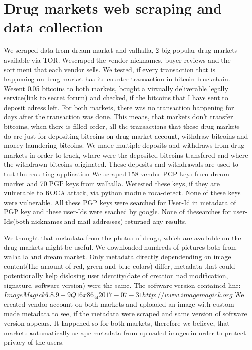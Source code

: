 \documentclass[
  digital, %
  table,   %
  lof,     %
  lot,     %
  oneside
]{fithesis3}
\begin{document}
\section{Drug markets web scraping and data collection}
We scraped data from dream market and valhalla, 2 big popular drug markets available via TOR. Wescraped the vendor nicknames, buyer reviews and the sortiment that each vendor sells.
We tested, if every transaction that is happening on drug market has its counter transaction in bitcoin blockchain. Wesent 0.05 bitcoins to both markets,
bought a virtually deliverable legally service(link to secret forum) and checked, if the bitcoins that I have sent to deposit adress left.
For both markets, there was no transaction happening for days after the transaction was done. This means, that markets don't transfer bitcoins,
when there is filled order, all the transactions that these drug markets do are just for depositing bitcoins on drug market account,
withdraw bitcoins and money laundering bitcoins.
We made multiple deposits and withdraws from drug markets in order to track, where were the deposited bitcoins transfered and where the withdrawn bitcoins originated.
These deposits and withdrawals are used to test the resulting application
We scraped 158 vendor PGP keys from dream market and 70 PGP keys from walhalla. Wetested these keys, if they are vulnerable to ROCA attack, via python module roca-detect. None of these keys were vulnerable.
All these PGP keys were searched for User-Id in metadata of PGP key and these user-Ids were seached by google. None of thesearches for user-Ids(both nicknames and mail addresses) returned any results.

We thought that metadata from the photos of drugs, which are available on the drug markets might be useful.
We downloaded hundreds of pictures both from walhalla and dream market.
Only metadata directly dependending on image content(like amount of red, green and blue colors) differ,
metadata that could potentionally help dislosing user identity(date of creation nad modification, signature, software version) were the same.
The software version contained line: $ImageMagick 6.8.9-9 Q16 x86_64 2017-07-31 http://www.imagemagick.org$
We created vendor account on both markets and uploaded an image with custom made metadata to see,
if the metadata were scraped and same version of software version appears. It happened so for both markets,
therefore we believe, that markets automatically scrape metadata from uploaded images in order to protect privacy of the users.
\end{document}
